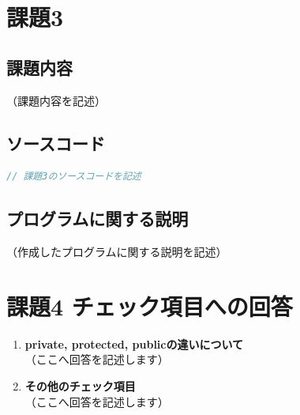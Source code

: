 \documentclass[paper=a4,fontsize=11pt]{jlreq}
\begin{document}
\section{課題3}
\subsection{課題内容}
（課題内容を記述）

\subsection{ソースコード}
\begin{lstlisting}[language=C++, caption=main.cpp (課題3)]
// 課題3のソースコードを記述
\end{lstlisting}

\subsection{プログラムに関する説明}
（作成したプログラムに関する説明を記述）


\section{課題4 チェック項目への回答}
\begin{enumerate}
    \item \textbf{private, protected, publicの違いについて} \\
    （ここへ回答を記述します）
    \item \textbf{その他のチェック項目} \\
    （ここへ回答を記述します）
\end{enumerate}
\end{document}

